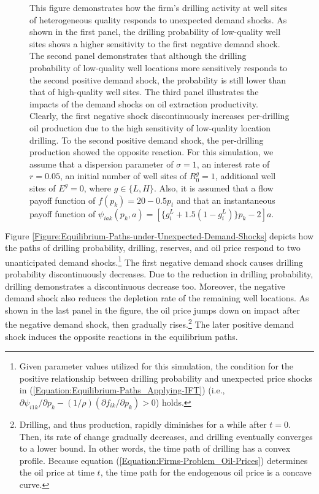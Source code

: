 {\begin{figure}[t!]
{{            This figure demonstrates how the firm's drilling activity at well sites of heterogeneous quality responds to unexpected demand shocks. As shown in the first panel, the drilling probability of low-quality well sites shows a higher sensitivity to the first negative demand shock. The second panel demonstrates that although the drilling probability of low-quality well locations more sensitively responds to the second positive demand shock, the probability is still lower than that of high-quality well sites. The third panel illustrates the impacts of the demand shocks on oil extraction productivity. Clearly, the first negative shock discontinuously increases per-drilling oil production due to the high sensitivity of low-quality location drilling. To the second positive demand shock, the per-drilling production showed the opposite reaction. For this simulation, we assume that a dispersion parameter of $\sigma = 1$, an interest rate of $r = 0.05$, an initial number of well sites of $R_{0}^{g} = 1$, additional well sites of $E^{g} = 0$, where $g \in \{ L, H \}$. Also, it is assumed that a flow payoff function of $f(p_{k}) = 20 - 0.5p_{t}$ and that an instantaneous payoff function of $\psi_{iak} (p_{k}, a) = [\{ g_{i}^{L} + 1.5(1 - g_{i}^{L}) \} p_{k} - 2]a$. 
        }}
        \label{Figure:Heterogeneous-Impacts-of-Unexpected-Price-Shocks-on-Equilibrium-Paths}
    \end{figure}
}

Figure \ref{Figure:Equilibrium-Paths-under-Unexpected-Demand-Shocks} depicts how the paths of drilling probability, drilling, reserves, and oil price respond to two unanticipated demand shocks.\footnote{Given parameter values utilized for this simulation, the condition for the positive relationship between drilling probability and unexpected price shocks in (\ref{Equation:Equilibrium-Paths_Applying-IFT}) (i.e., $\partial \psi_{i1k} / \partial p_{k} - (1/\rho)(\partial f_{ik} / \partial p_{k}) > 0$) holds.} The first negative demand shock causes drilling probability discontinuously decreases. Due to the reduction in drilling probability, drilling demonstrates a discontinuous decrease too. Moreover, the negative demand shock also reduces the depletion rate of the remaining well locations. As shown in the last panel in the figure, the oil price jumps down on impact after the negative demand shock, then gradually rises.\footnote{Drilling, and thus production, rapidly diminishes for a while after $t = 0$. Then, its rate of change gradually decreases, and drilling eventually converges to a lower bound. In other words, the time path of drilling has a convex profile. Because equation (\ref{Equation:Firms-Problem_Oil-Prices}) determines the oil price at time $t$, the time path for the endogenous oil price is a concave curve.} The later positive demand shock induces the opposite reactions in the equilibrium paths. 
